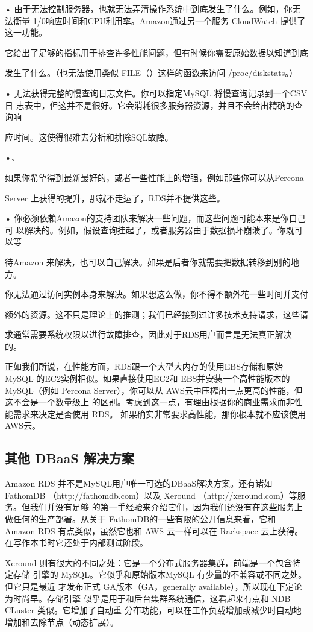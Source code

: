 • 由于无法控制服务器，也就无法弄清操作系统中到底发生了什么。例如，你无法衡量
1/0响应时间和CPU利用率。Amazon通过另一个服务 CloudWatch 提供了这一功能。

它给出了足够的指标用于排查许多性能问题，但有时候你需要原始数据以知道到底

发生了什么。（也无法使用类似 FILE（）这样的函数来访问 /proc/diskstats。）

• 无法获得完整的慢查询日志文件。你可以指定MySQL 将慢查询记录到一个CSV日
志表中，但这并不是很好。它会消耗很多服务器资源，并且不会给出精确的查询响

应时间。这使得很难去分析和排除SQL故障。

•、

如果你希望得到最新最好的，或者一些性能上的增强，例如那些你可以从Percona

Server 上获得的提升，那就不走运了，RDS并不提供这些。

• 你必须依赖Amazon的支持团队来解决一些问题，而这些问题可能本来是你自己可
以解决的。例如，假设查询挂起了，或者服务器由于数据损坏崩溃了。你既可以等

待Amazon 来解决，也可以自己解决。如果是后者你就需要把数据转移到别的地方。

你无法通过访问实例本身来解决。如果想这么做，你不得不额外花一些时间并支付

额外的资源。这不只是理论上的推测；我们已经接到过许多技术支持请求，这些请

求通常需要系统权限以进行故障排查，因此对于RDS用户而言是无法真正解决的。

正如我们所说，在性能方面，RDS跟一个大型大内存的使用EBS存储和原始MySQL
的EC2实例相似。如果直接使用EC2和 EBS并安装一个高性能版本的 MySQL（例如
Percona Server），你可以从 AWS云中压榨出一点更高的性能，但这不会是一个数量级上
的区别。考虑到这一点，有理由根据你的商业需求而非性能需求来决定是否使用 RDS。
如果确实非常要求高性能，那你根本就不应该使用AWS云。

\subsection{其他 DBaaS 解决方案}
Amazon RDS 并不是MySQL用户唯一可选的DBaaS解决方案。还有诸如 FathomDB
（http://fathomdb.com）以及 Xeround （http://xeround.com）等服务。但我们并没有足够
的第一手经验来介绍它们，因为我们还没有在这些服务上做任何的生产部署。从关于
FathomDB的一些有限的公开信息来看，它和 Amazon RDS 有点类似，虽然它也和 AWS
云一样可以在 Rackspace 云上获得。在写作本书时它还处于内部测试阶段。

Xeround 则有很大的不同之处：它是一个分布式服务器集群，前端是一个包含特定存储
引擎的 MySQL。它似乎和原始版本MySQL 有少量的不兼容或不同之处。但它只是最近
才发布正式 GA版本（GA，generally available），所以现在下定论为时尚早。存储引擎
似乎是用于和后台集群系统通信，这看起来有点和 NDB CLuster 类似。它增加了自动重
分布功能，可以在工作负载增加或减少时自动地增加和去除节点（动态扩展）。

